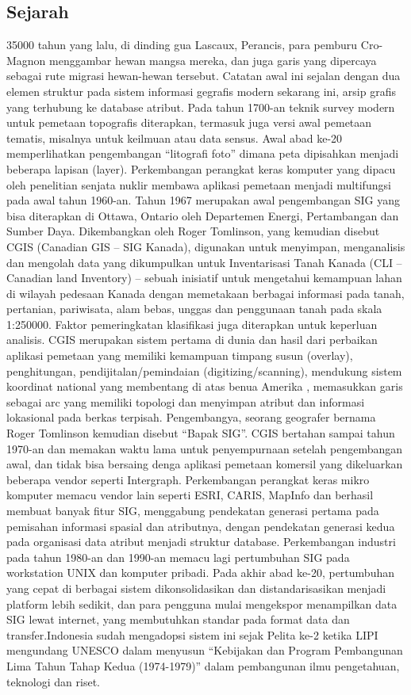 \subsection{Sejarah}
35000 tahun yang lalu, di dinding gua Lascaux, Perancis, para pemburu Cro-Magnon menggambar hewan mangsa mereka, dan juga garis yang dipercaya sebagai rute migrasi hewan-hewan tersebut. Catatan awal ini sejalan dengan dua elemen struktur pada sistem informasi gegrafis modern sekarang ini, arsip grafis yang terhubung ke database atribut.
Pada tahun 1700-an teknik survey modern untuk pemetaan topografis diterapkan, termasuk juga versi awal pemetaan tematis, misalnya untuk keilmuan atau data sensus. Awal abad ke-20 memperlihatkan pengembangan “litografi foto” dimana peta dipisahkan menjadi beberapa lapisan (layer). Perkembangan perangkat keras komputer yang dipacu oleh penelitian senjata nuklir membawa aplikasi pemetaan menjadi multifungsi pada awal tahun 1960-an.
Tahun 1967 merupakan awal pengembangan SIG yang bisa diterapkan di Ottawa, Ontario oleh Departemen Energi, Pertambangan dan Sumber Daya. Dikembangkan oleh Roger Tomlinson, yang kemudian disebut CGIS (Canadian GIS – SIG Kanada), digunakan untuk menyimpan, menganalisis dan mengolah data yang dikumpulkan untuk Inventarisasi Tanah Kanada (CLI – Canadian land Inventory) – sebuah inisiatif untuk mengetahui kemampuan lahan di wilayah pedesaan Kanada dengan memetakaan berbagai informasi pada tanah, pertanian, pariwisata, alam bebas, unggas dan penggunaan tanah pada skala 1:250000. Faktor pemeringkatan klasifikasi juga diterapkan untuk keperluan analisis. CGIS merupakan sistem pertama di dunia dan hasil dari perbaikan aplikasi pemetaan yang memiliki kemampuan timpang susun (overlay), penghitungan, pendijitalan/pemindaian (digitizing/scanning), mendukung sistem koordinat national yang membentang di atas benua Amerika , memasukkan garis sebagai arc yang memiliki topologi dan menyimpan atribut dan informasi lokasional pada berkas terpisah. Pengembangya, seorang geografer bernama Roger Tomlinson kemudian disebut “Bapak SIG”. CGIS bertahan sampai tahun 1970-an dan memakan waktu lama untuk penyempurnaan setelah pengembangan awal, dan tidak bisa bersaing denga aplikasi pemetaan komersil yang dikeluarkan beberapa vendor seperti Intergraph. Perkembangan perangkat keras mikro komputer memacu vendor lain seperti ESRI, CARIS, MapInfo dan berhasil membuat banyak fitur SIG, menggabung pendekatan generasi pertama pada pemisahan informasi spasial dan atributnya, dengan pendekatan generasi kedua pada organisasi data atribut menjadi struktur database. Perkembangan industri pada tahun 1980-an dan 1990-an memacu lagi pertumbuhan SIG pada workstation UNIX dan komputer pribadi. Pada akhir abad ke-20, pertumbuhan yang cepat di berbagai sistem dikonsolidasikan dan distandarisasikan menjadi platform lebih sedikit, dan para pengguna mulai mengekspor menampilkan data SIG lewat internet, yang membutuhkan standar pada format data dan transfer.Indonesia sudah mengadopsi sistem ini sejak Pelita ke-2 ketika LIPI mengundang UNESCO dalam menyusun “Kebijakan dan Program Pembangunan Lima Tahun Tahap Kedua (1974-1979)” dalam pembangunan ilmu pengetahuan, teknologi dan riset.



